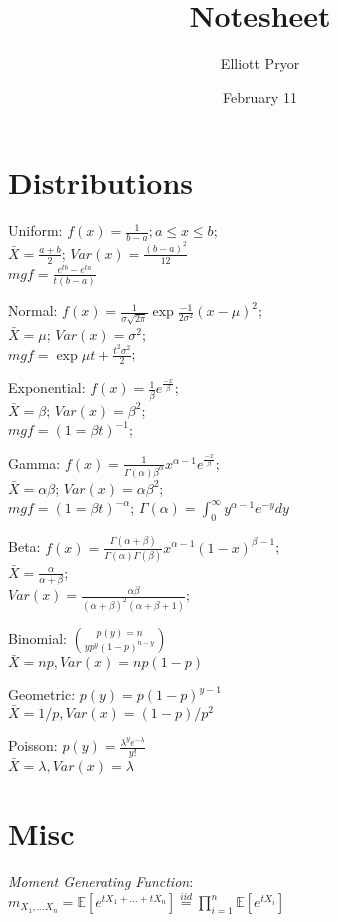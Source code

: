 \documentclass[10pt]{article}
\title{Notesheet}
\author{Elliott Pryor}
\date{February 11}
\begin{document}


\section{Distributions}
Uniform: $f(x) = \frac{1}{b - a}; a \leq x \leq b$;\\
$\bar{X} = \frac{a + b}{2}$;
$Var(x) = \frac{(b-a)^2}{12}$\\
$mgf = \frac{e^{tb} - e^{ta}}{t(b - a)}$

Normal: $f(x) = \frac{1}{\sigma \sqrt{2 \pi}} \exp{\frac{-1}{2\sigma^2}(x - \mu)^2}$;\\
$\bar{X} = \mu$;
$Var(x) = \sigma^2$;\\
$mgf = \exp{\mu t + \frac{t^2 \sigma^2}{2}}$;

Exponential: $f(x) = \frac{1}{\beta} e^{\frac{-x}{\beta}}$;\\
$\bar{X} = \beta$;
$Var(x) = \beta^2$;\\
$mgf = (1 = \beta t)^{-1}$;

Gamma: $f(x) = \frac{1}{\Gamma(\alpha)\beta^\alpha} x^{\alpha - 1} e^{\frac{-x}{\beta}}$;\\
$\bar{X} = \alpha \beta$;
$Var(x) = \alpha \beta^2$;\\
$mgf = (1 = \beta t)^{-\alpha}$;
$\Gamma(\alpha) = \int_0^\infty y^{\alpha - 1}e^{-y}dy$

Beta: $f(x) = \frac{\Gamma(\alpha + \beta)}{\Gamma(\alpha) \Gamma(\beta)} x^{\alpha-1} (1 - x)^{\beta - 1}$;\\
$\bar{X} = \frac{\alpha}{\alpha + \beta}$;\\
$Var(x) = \frac{\alpha \beta}{(\alpha + \beta)^2(\alpha + \beta + 1)}$;

Binomial: $p(y) = n \choose y p^y (1-p)^{n-y}$\\
$\bar{X} = np, Var(x) = np(1-p)$

Geometric: $p(y) = p(1-p)^{y-1}$\\
$\bar{X} = 1/p, Var(x) = (1-p)/p^2$

Poisson: $p(y) = \frac{\lambda^y e^{-\lambda}}{y!}$\\
$\bar{X} = \lambda, Var(x) = \lambda$

\section{Misc}
\emph{Moment Generating Function}:\\
$m_{X_1, \dots X_n} = \mathbb{E}[e^{tX_1 + \dots + tX_n}] \stackrel{iid}{=} \prod_{i=1}^n \mathbb{E}[e^{tX_i}]$
\end{document}
